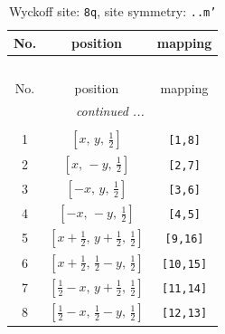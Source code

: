 \documentclass[fleqn,8pt]{jsarticle}
\begin{document}
\begin{longtable}{ccc}
\caption{Wyckoff site: {\tt 8q}, site symmetry: {\tt ..m'}}
 \\
 \hline \hline
No. & position & mapping \\ \hline \endfirsthead

\multicolumn{2}{l}{\tablename\ \thetable{}} \\
 \hline \hline
No. & position & mapping \\ \hline \endhead

 \hline \hline
\multicolumn{2}{r}{\footnotesize\it continued ...} \\ \endfoot

 \hline \hline
\multicolumn{2}{r}{} \\ \endlastfoot

1 & $\left[ x,\, y,\, \frac{1}{2} \right]$ & {\tt [1,8]} \\ \hline
2 & $\left[ x,\, - y,\, \frac{1}{2} \right]$ & {\tt [2,7]} \\ \hline
3 & $\left[ - x,\, y,\, \frac{1}{2} \right]$ & {\tt [3,6]} \\ \hline
4 & $\left[ - x,\, - y,\, \frac{1}{2} \right]$ & {\tt [4,5]} \\ \hline
5 & $\left[ x + \frac{1}{2},\, y + \frac{1}{2},\, \frac{1}{2} \right]$ & {\tt [9,16]} \\ \hline
6 & $\left[ x + \frac{1}{2},\, \frac{1}{2} - y,\, \frac{1}{2} \right]$ & {\tt [10,15]} \\ \hline
7 & $\left[ \frac{1}{2} - x,\, y + \frac{1}{2},\, \frac{1}{2} \right]$ & {\tt [11,14]} \\ \hline
8 & $\left[ \frac{1}{2} - x,\, \frac{1}{2} - y,\, \frac{1}{2} \right]$ & {\tt [12,13]} \\
\end{longtable}
\renewcommand{\arraystretch}{1.2}
\end{document}
